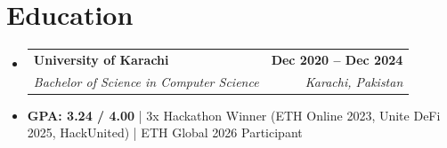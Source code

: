 \documentclass[letterpaper,11pt]{article}
\makeatletter
\newcommand{\resumeItem}[1]{
  \item\small{
    {#1 \vspace{-2pt}}
  }
}
\newcommand{\resumeSubheading}[4]{
  \vspace{-2pt}\item
    \begin{tabular*}{1.0\textwidth}[t]{l@{\extracolsep{\fill}}r}
      \textbf{#1} & \textbf{\small #2} \\
      \textit{\small#3} & \textit{\small #4} \\
    \end{tabular*}\vspace{-7pt}
}
\newcommand{\resumeSubHeadingListStart}{\begin{itemize}[leftmargin=0.0in, label={}]}
\newcommand{\resumeSubHeadingListEnd}{\end{itemize}}\vspace{0pt}
\newcommand{\resumeItemListStart}{\begin{itemize}}
\newcommand{\resumeItemListEnd}{\end{itemize}\vspace{-5pt}}
\makeatother
\begin{document}
\section{Education}
  \resumeSubHeadingListStart
    \resumeSubheading
      {University of Karachi}{Dec 2020 -- Dec 2024}
      {Bachelor of Science in Computer Science}{Karachi, Pakistan}
  \resumeSubHeadingListEnd
    \resumeItemListStart
        \resumeItem {\textbf{GPA: 3.24 / 4.00} | 3x Hackathon Winner (ETH Online 2023, Unite DeFi 2025, HackUnited) | ETH Global 2026 Participant}
    \resumeItemListEnd
\end{document}
